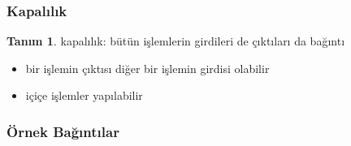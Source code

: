 \documentclass[dvipsnames]{beamer}
\theoremstyle{definition}
\newtheorem{tanim}[theorem]{Tanım}
\theoremstyle{example}
\theoremstyle{plain}
\begin{document}
\begin{frame}
  \frametitle{Kapalılık}

  \begin{tanim}
    \alert{kapalılık}: bütün işlemlerin girdileri de çıktıları da bağıntı
  \end{tanim}

  \pause
  \begin{itemize}
    \item bir işlemin çıktısı diğer bir işlemin girdisi olabilir
    \item içiçe işlemler yapılabilir
  \end{itemize}
\end{frame}

\begin{frame}
  \frametitle{Örnek Bağıntılar}


\end{frame}
\end{document}
